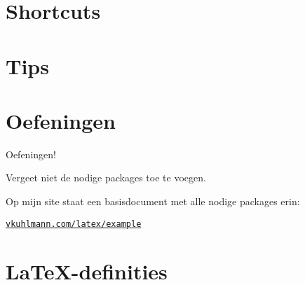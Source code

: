 \documentclass[
    dutch,
    everyoneauthor=true,
    defaultSlideCollection=vincent,
]{../../cursuspresentatie}
\let\placetarget\relax
\let\placetarget\relax
\begin{document}





\section{Shortcuts}

\def\placetarget{\hypertarget{shortcuts}{}}

\begin{frame}
\end{frame}



\section{Tips}

\def\placetarget{\hypertarget{tips}{}}


\begin{frame}
\end{frame}


\section{Oefeningen}

\def\placetarget{\hypertarget{oefeningen1}{}}

\begin{frame}
    \begin{center}
        {\LARGE Oefeningen!}
        \vspace{30pt}

        Vergeet niet de nodige packages toe te voegen.
        
        Op mijn site staat een basisdocument met alle nodige packages erin:

        \href{https://vkuhlmann.com/latex/example}{\nolinkurl{vkuhlmann.com/latex/example}}
    \end{center}
\end{frame}



\section{\LaTeX-definities}
\end{document}
